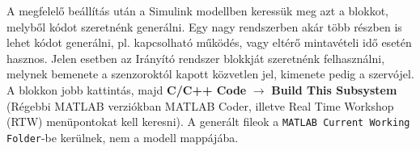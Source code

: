A megfelelő beállítás után a Simulink modellben keressük meg azt a blokkot, melyből kódot szeretnénk generálni. Egy nagy rendszerben akár több részben is lehet kódot generálni, pl. kapcsolható működés, vagy eltérő mintavételi idő esetén hasznos. Jelen esetben az Irányító rendszer blokkját szeretnénk felhasználni, melynek bemenete a szenzoroktól kapott közvetlen jel, kimenete pedig a szervójel. A blokkon jobb kattintás, majd \textbf{C/C++ Code} $\rightarrow$ \textbf{Build This Subsystem} (Régebbi MATLAB verziókban MATLAB Coder, illetve Real Time Workshop (RTW) menüpontokat kell keresni). A generált fileok a \verb!MATLAB Current Working Folder!-be kerülnek, nem a modell mappájába.









